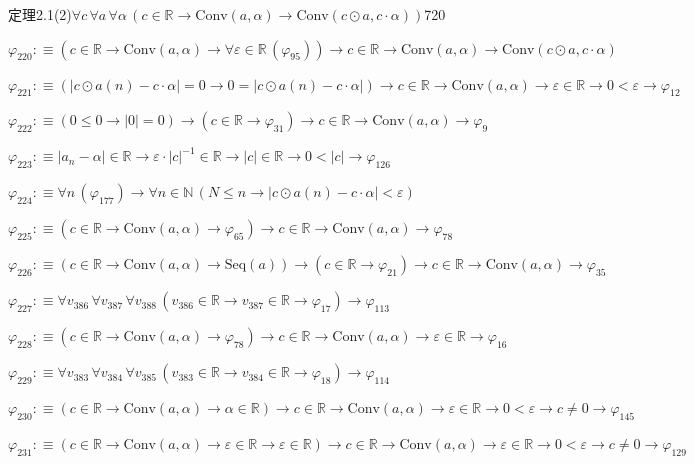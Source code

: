\begin{fullproof}{定理2.1(2)}{$\forall c\,\forall a\,\forall \alpha\,(c \in \mathbb{R} \to \mathrm{Conv}(a,\alpha) \to \mathrm{Conv}(c \odot a,c \cdot \alpha))$}{720}
\begin{abbrevlist}
\item $\varphi_{220} :\equiv (c \in \mathbb{R} \to \mathrm{Conv}(a,\alpha) \to \forall \varepsilon \in \mathbb{R}\,(\varphi_{95})) \to c \in \mathbb{R} \to \mathrm{Conv}(a,\alpha) \to \mathrm{Conv}(c \odot a,c \cdot \alpha)$
\item $\varphi_{221} :\equiv (\lvert c \odot a(n) - c \cdot \alpha \rvert = 0 \to 0 = \lvert c \odot a(n) - c \cdot \alpha \rvert) \to c \in \mathbb{R} \to \mathrm{Conv}(a,\alpha) \to \varepsilon \in \mathbb{R} \to 0 < \varepsilon \to \varphi_{12}$
\item $\varphi_{222} :\equiv (0 \leq 0 \to \lvert 0 \rvert = 0) \to (c \in \mathbb{R} \to \varphi_{31}) \to c \in \mathbb{R} \to \mathrm{Conv}(a,\alpha) \to \varphi_{9}$
\item $\varphi_{223} :\equiv \lvert a_{n} - \alpha \rvert \in \mathbb{R} \to \varepsilon \cdot \lvert c \rvert^{-1} \in \mathbb{R} \to \lvert c \rvert \in \mathbb{R} \to 0 < \lvert c \rvert \to \varphi_{126}$
\item $\varphi_{224} :\equiv \forall n\,(\varphi_{177}) \to \forall n \in \mathbb{N}\,(N \leq n \to \lvert c \odot a(n) - c \cdot \alpha \rvert < \varepsilon)$
\item $\varphi_{225} :\equiv (c \in \mathbb{R} \to \mathrm{Conv}(a,\alpha) \to \varphi_{65}) \to c \in \mathbb{R} \to \mathrm{Conv}(a,\alpha) \to \varphi_{78}$
\item $\varphi_{226} :\equiv (c \in \mathbb{R} \to \mathrm{Conv}(a,\alpha) \to \mathrm{Seq}(a)) \to (c \in \mathbb{R} \to \varphi_{21}) \to c \in \mathbb{R} \to \mathrm{Conv}(a,\alpha) \to \varphi_{35}$
\item $\varphi_{227} :\equiv \forall v_{386}\,\forall v_{387}\,\forall v_{388}\,(v_{386} \in \mathbb{R} \to v_{387} \in \mathbb{R} \to \varphi_{17}) \to \varphi_{113}$
\item $\varphi_{228} :\equiv (c \in \mathbb{R} \to \mathrm{Conv}(a,\alpha) \to \varphi_{78}) \to c \in \mathbb{R} \to \mathrm{Conv}(a,\alpha) \to \varepsilon \in \mathbb{R} \to \varphi_{16}$
\item $\varphi_{229} :\equiv \forall v_{383}\,\forall v_{384}\,\forall v_{385}\,(v_{383} \in \mathbb{R} \to v_{384} \in \mathbb{R} \to \varphi_{18}) \to \varphi_{114}$
\item $\varphi_{230} :\equiv (c \in \mathbb{R} \to \mathrm{Conv}(a,\alpha) \to \alpha \in \mathbb{R}) \to c \in \mathbb{R} \to \mathrm{Conv}(a,\alpha) \to \varepsilon \in \mathbb{R} \to 0 < \varepsilon \to c \neq 0 \to \varphi_{145}$
\item $\varphi_{231} :\equiv (c \in \mathbb{R} \to \mathrm{Conv}(a,\alpha) \to \varepsilon \in \mathbb{R} \to \varepsilon \in \mathbb{R}) \to c \in \mathbb{R} \to \mathrm{Conv}(a,\alpha) \to \varepsilon \in \mathbb{R} \to 0 < \varepsilon \to c \neq 0 \to \varphi_{129}$

\end{abbrevlist}
\end{fullproof}
